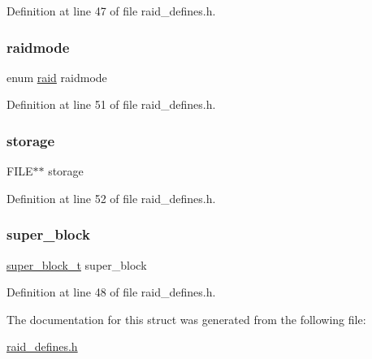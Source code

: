 Definition at line 47 of file raid\+\_\+defines.\+h.

\mbox{\label{structvirtual__disk__s_a207dd070642dde7ad48f8bb8b622f893}} 
\subsubsection{\texorpdfstring{raidmode}{raidmode}}
{\footnotesize\ttfamily enum \hyperlink{raid__defines_8h_a7a2279e0841d50aa8e976d3bb0eb3a6e}{raid} raidmode}



Definition at line 51 of file raid\+\_\+defines.\+h.

\mbox{\label{structvirtual__disk__s_abed1c5c15dd8f784e7198b79f8973863}} 
\subsubsection{\texorpdfstring{storage}{storage}}
{\footnotesize\ttfamily F\+I\+LE$\ast$$\ast$ storage}



Definition at line 52 of file raid\+\_\+defines.\+h.

\mbox{\label{structvirtual__disk__s_a32d9616143f7763451383a6c626038ca}} 
\subsubsection{\texorpdfstring{super\+\_\+block}{super\_block}}
{\footnotesize\ttfamily \hyperlink{raid__defines_8h_a5b2244b463782d93e6dfc058790cb9eb}{super\+\_\+block\+\_\+t} super\+\_\+block}



Definition at line 48 of file raid\+\_\+defines.\+h.



The documentation for this struct was generated from the following file\+:\begin{DoxyCompactItemize}
\item 
\hyperlink{raid__defines_8h}{raid\+\_\+defines.\+h}\end{DoxyCompactItemize}
